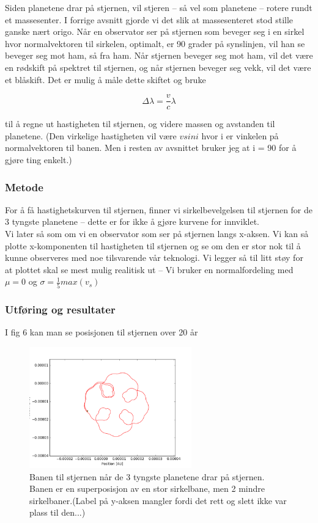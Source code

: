 \documentclass[a4paper,norsk,11pt,twoside]{article}
\begin{document}
Siden planetene drar på stjernen, vil stjeren -- så vel som planetene -- rotere rundt et massesenter. I forrige avsnitt gjorde vi det slik at massesenteret stod stille ganske nært origo. Når en observator ser på stjernen som beveger seg i en sirkel hvor normalvektoren til sirkelen, optimalt, er 90 grader på synslinjen, vil han se beveger seg mot ham, så fra ham. Når stjernen beveger seg mot ham, vil det være en rødskift på spektret til stjernen, og når stjernen beveger seg vekk, vil det være et blåskift. Det er mulig å måle dette skiftet og bruke

\begin{equation}
\Delta \lambda = \frac{v}{c}\lambda
\end{equation} 

til å regne ut hastigheten til stjernen, og videre massen og avstanden til planetene. (Den virkelige hastigheten vil være $v sin i$ hvor i er vinkelen på normalvektoren til banen. Men i resten av avsnittet bruker jeg at i = 90 for å gjøre ting enkelt.)

\subsubsection{Metode}

For å få hastighetskurven til stjernen, finner vi sirkelbevelgelsen til stjernen for de 3 tyngste planetene -- dette er for ikke å gjøre kurvene for innviklet. \\

Vi later så som om vi en observator som ser på stjernen langs x-aksen. Vi kan så plotte x-komponenten til hastigheten til stjernen og se om den er stor nok til å kunne observeres med noe tilsvarende vår teknologi. Vi legger så til litt støy for at plottet skal se mest mulig realitisk ut -- Vi bruker en normalfordeling med $\mu = 0$ og $\sigma = \frac{1}{5} max(v_s)$


\subsubsection{Utføring og resultater}

I fig 6 kan man se posisjonen til stjernen over 20 år


\begin{figure}[hbt]
\begin{center}
\includegraphics[width=70mm]{star_pos_3_planets.png}
\caption{Banen til stjernen når de 3 tyngste planetene drar på stjernen. Banen er en superposisjon av en stor sirkelbane, men 2 mindre sirkelbaner.(Label på y-aksen mangler fordi det rett og slett ikke var plass til den...)}\label{fig:finfigur}
\end{center}
\end{figure}
\end{document}
